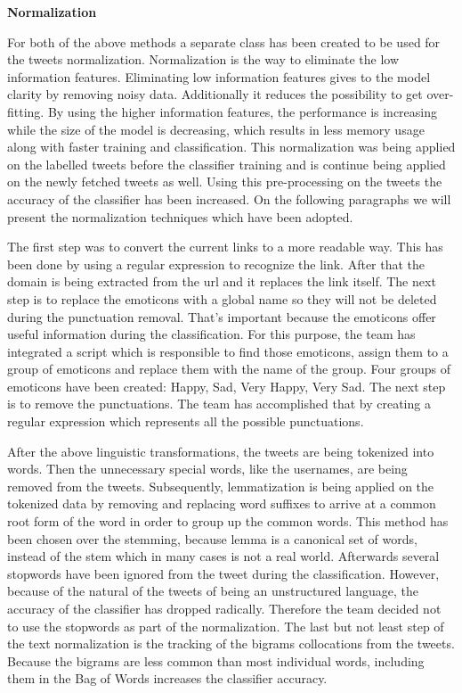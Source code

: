 \textbf{Normalization}

For both of the above methods a separate class has been created to be used for the tweets normalization. Normalization is the way to eliminate the low information features. Eliminating low information features gives to the model clarity by removing noisy data. Additionally it reduces the possibility to get over-fitting. By using the higher information features, the performance is increasing while the size of the model is decreasing, which results in less memory usage along with faster training and classification. This normalization was being applied on the labelled tweets before the classifier training and is continue being applied on the newly fetched tweets as well. Using this pre-processing on the tweets the accuracy of the classifier has been increased. On the following paragraphs we will present the normalization techniques which have been adopted. 

The first step was to convert the current links to a more readable way. This has been done by using a regular expression to recognize the link. After that the domain is being extracted from the url and it replaces the link itself. The next step is to replace the emoticons with a global name so they will not be deleted during the punctuation removal. That’s important because the emoticons offer useful information during the classification. For this purpose, the team has integrated a script which is responsible to find those emoticons, assign them to a group of emoticons and replace them with the name of the group. Four groups of emoticons have been created: Happy, Sad, Very Happy, Very Sad. The next step is to remove the punctuations. The team has accomplished that by creating a regular expression which represents all the possible punctuations. 

After the above linguistic transformations, the tweets are being tokenized into words. Then the unnecessary special words, like the usernames, are being removed from the tweets. Subsequently, lemmatization is being applied on the tokenized data by removing and replacing word suffixes to arrive at a common root form of the word in order to group up the common words. This method has been chosen over the stemming, because lemma is a canonical set of words, instead of the stem which in many cases is not a real world. Afterwards several stopwords have been ignored from the tweet during the classification. However, because of the natural of the tweets of being an unstructured language, the accuracy of the classifier has dropped radically. Therefore the team decided not to use the stopwords as part of the normalization. The last but not least step of the text normalization is the tracking of the bigrams collocations from the tweets. Because the bigrams are less common than most individual words, including them in the Bag of Words increases the classifier accuracy.

